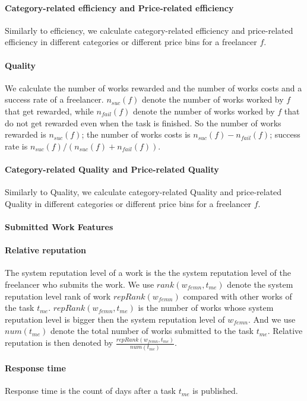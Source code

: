 \documentclass{article}
\begin{document}
  \paragraph{ Category-related efficiency and Price-related efficiency} Similarly to efficiency,  we calculate category-related efficiency and price-related efficiency in different categories or different price bins for a freelancer $f$.
 \paragraph{Quality} We calculate the number of works rewarded and the number of works costs and a success rate of a freelancer. ${n}_{suc}(f)$ denote the number of works worked by $f$ that get rewarded, while ${n}_{fail}(f)$ denote the number of works worked by $f$ that do not get rewarded even when the task is finished. So the number of works rewarded is ${n}_{suc}(f)$;  the number of works costs is ${n}_{suc}(f) - {n}_{fail}(f)$; success rate is ${n}_{suc}(f)/({n}_{suc}(f) + {n}_{fail}(f))$.
   \paragraph{ Category-related Quality and Price-related Quality} Similarly to Quality,  we calculate category-related Quality and price-related Quality in different categories or different price bins for a freelancer $f$.
\paragraph{Submitted Work Features}
\paragraph{Relative reputation} The system reputation level of a work is the the system reputation level of the freelancer who submits the work. We use $rank({w}_{femn}, {t}_{me})$ denote the system reputation level rank of work $repRank({w}_{femn})$ compared with other works of the task ${t}_{me}$. $repRank({w}_{femn}, {t}_{me})$ is the number of works whose system reputation level is bigger then the system reputation level of ${w}_{femn}$. And we use $num({t}_{me})$ denote the total number of works submitted to the task ${t}_{me}$. Relative reputation is then denoted by $\frac{repRank({w}_{femn}, {t}_{me})}{num({t}_{me})}$.
\paragraph{Response time} Response time is the count of days after a task  ${t}_{me}$ is published.
\end{document}
